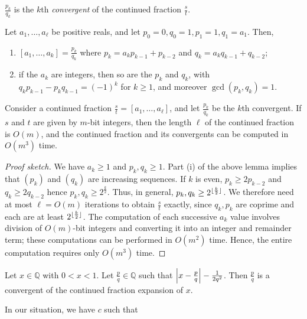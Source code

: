\( \frac{p_k}{q_k} \) is the \( k \)th \emph{convergent} of the continued fraction \( \frac{s}{t} \).
\begin{lemma}
    Let \( a_1, \dots, a_\ell \) be positive reals, and let \( p_0 = 0, q_0 = 1, p_1 = 1, q_1 = a_1 \).
    Then,
    \begin{enumerate}
        \item \( [a_1, \dots, a_k] = \frac{p_k}{q_k} \) where \( p_k = a_k p_{k-1} + p_{k-2} \) and \( q_k = a_k q_{k-1} + q_{k-2} \);
        \item if the \( a_k \) are integers, then so are the \( p_k \) and \( q_k \), with \( q_k p_{k-1} - p_k q_{k-1} = (-1)^k \) for \( k \geq 1 \), and moreover \( \gcd(p_k, q_k) = 1 \).
    \end{enumerate}
\end{lemma}
\begin{theorem}
    Consider a continued fraction \( \frac{s}{t} = [a_1, \dots, a_\ell] \), and let \( \frac{p_k}{q_k} \) be the \( k \)th convergent.
    If \( s \) and \( t \) are given by \( m \)-bit integers, then the length \( \ell \) of the continued fraction is \( O(m) \), and the continued fraction and its convergents can be computed in \( O(m^3) \) time.
\end{theorem}
\begin{proof}[Proof sketch]
    We have \( a_k \geq 1 \) and \( p_k, q_k \geq 1 \).
    Part (i) of the above lemma implies that \( (p_k) \) and \( (q_k) \) are increasing sequences.
    If \( k \) is even, \( p_k \geq 2p_{k-2} \) and \( q_k \geq 2q_{k-2} \) hence \( p_k, q_k \geq 2^{\frac{k}{2}} \).
    Thus, in general, \( p_k, q_k \geq 2^{\lfloor\frac{k}{2}\rfloor} \).
    We therefore need at most \( \ell = O(m) \) iterations to obtain \( \frac{s}{t} \) exactly, since \( q_k, p_k \) are coprime and each are at least \( 2^{\lfloor\frac{k}{2}\rfloor} \).
    The computation of each successive \( a_k \) value involves division of \( O(m) \)-bit integers and converting it into an integer and remainder term; these computations can be performed in \( O(m^2) \) time.
    Hence, the entire computation requires only \( O(m^3) \) time.
\end{proof}
\begin{theorem}
    Let \( x \in \mathbb Q \) with \( 0 < x < 1 \).
    Let \( \frac{p}{q} \in \mathbb Q \) such that \( \abs{x - \frac{p}{q}} - \frac{1}{2q^2} \).
    Then \( \frac{p}{q} \) is a convergent of the continued fraction expansion of \( x \).
\end{theorem}
In our situation, we have \( c \) such that
